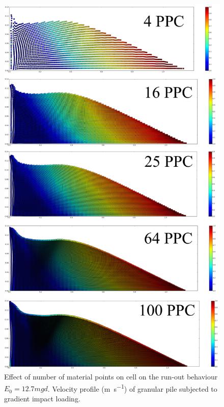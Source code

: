 \begin{figure}[tbhp]
\centering
\includegraphics[height=\textheight]{MPM_50ppc}
\caption{Effect of number of material points on cell on the run-out behaviour 
$E_0=12.7mgd$. 
Velocity profile (\si{\m\per\s}) of granular pile subjected to gradient impact 
loading.}
\label{fig:MPM_50ppc}
\end{figure}


